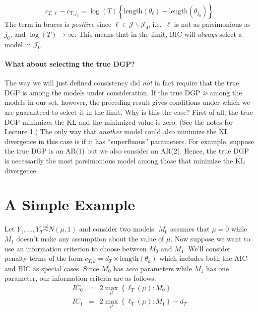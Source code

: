 \documentclass[12pt]{article}
\theoremstyle{definition}
\begin{document}
	$$c_{T,\ell} - c_{T,j_0} = \log(T) \left\{\mbox{length}(\theta_\ell) - \mbox{length}(\theta_{j_0}) \right\}$$
The term in braces is \emph{positive} since $\ell \in\mathcal{J}\backslash \mathcal{J}_0$, i.e.\ $\ell$ is not as parsimonious as $j_0$, and $\log(T) \rightarrow \infty$. This means that in the limit, BIC will \emph{always} select a model in $\mathcal{J}_0$.

\paragraph{What about selecting the true DGP?}
The way we will just defined consistency did \emph{not} in fact require that the true DGP is among the models under consideration. If the true DGP \emph{is} among the models in our set, however, the preceding result gives conditions under which we are guaranteed to select it in the limit. Why is this the case? First of all, the true DGP minimizes the KL and the minimized value is zero. (See the notes for Lecture 1.) The only way that \emph{another} model could also minimize the KL divergence in this case is if it has ``superfluous'' parameters. For example, suppose the true DGP is an AR(1) but we also consider an AR(2). Hence, the true DGP is necessarily the most parsimonious model among those that minimize the KL divergence. 


\section{A Simple Example}
Let $Y_1, \hdots, Y_T \overset{\mbox{iid}}{\sim} N(\mu,1)$ and consider two models: $M_0$ assumes that $\mu = 0$ while $M_1$ doesn't make any assumption about the value of $\mu$. Now suppose we want to use an information criterion to choose between $M_0$ and $M_1$. We'll consider penalty terms of the form $c_{T,k} = d_T 
\times \mbox{length}(\theta_k)$ which includes both the AIC and BIC as special cases. Since $M_0$ has \emph{zero} parameters while $M_1$ has one parameter, our information criteria are as follows:
	\begin{eqnarray*}
		IC_0 &=& 2 \max_\mu \left\{\ell_T(\mu)\colon M_0 \right\} \\
		IC_1 &=& 2 \max_\mu \left\{\ell_T(\mu)\colon M_1 \right\} - d_T
	\end{eqnarray*}
\end{document}
